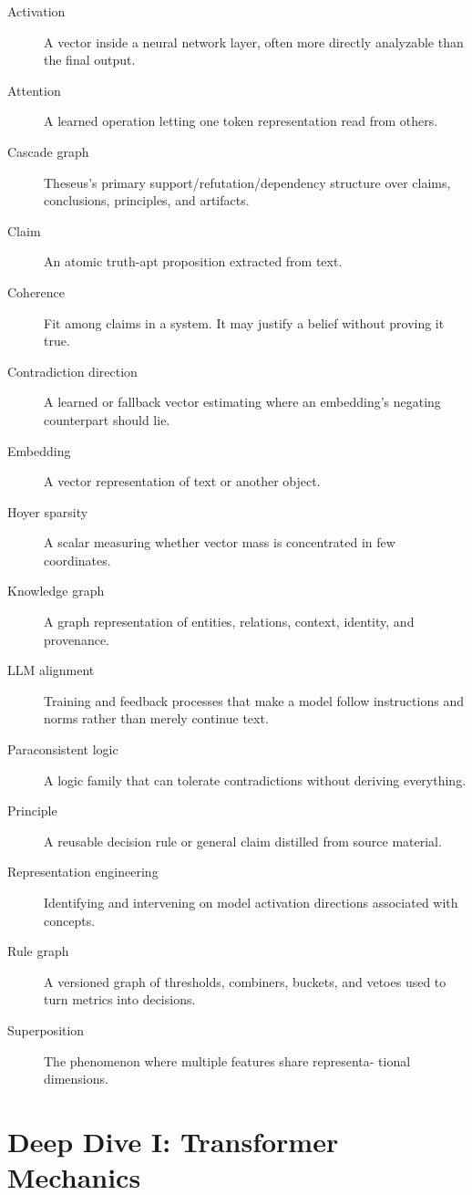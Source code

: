 \documentclass[11pt]{article}
\begin{document}
\begin{description}
\item[Activation] A vector inside a neural network layer, often more directly
analyzable than the final output.
\item[Attention] A learned operation letting one token representation read
from others.
\item[Cascade graph] Theseus's primary support/refutation/dependency structure
over claims, conclusions, principles, and artifacts.
\item[Claim] An atomic truth-apt proposition extracted from text.
\item[Coherence] Fit among claims in a system. It may justify a belief without
proving it true.
\item[Contradiction direction] A learned or fallback vector estimating where an
embedding's negating counterpart should lie.
\item[Embedding] A vector representation of text or another object.
\item[Hoyer sparsity] A scalar measuring whether vector mass is concentrated in
few coordinates.
\item[Knowledge graph] A graph representation of entities, relations, context,
identity, and provenance.
\item[LLM alignment] Training and feedback processes that make a model follow
instructions and norms rather than merely continue text.
\item[Paraconsistent logic] A logic family that can tolerate contradictions
without deriving everything.
\item[Principle] A reusable decision rule or general claim distilled from
source material.
\item[Representation engineering] Identifying and intervening on model
activation directions associated with concepts.
\item[Rule graph] A versioned graph of thresholds, combiners, buckets, and
vetoes used to turn metrics into decisions.
\item[Superposition] The phenomenon where multiple features share representa-
tional dimensions.
\end{description}



\section{Deep Dive I: Transformer Mechanics}
\end{document}
